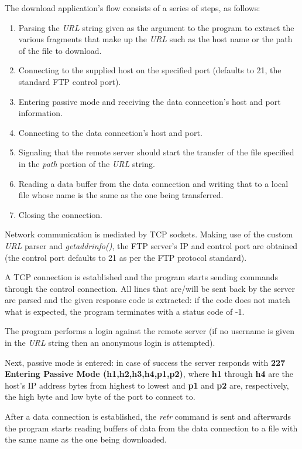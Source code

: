 \documentclass[11pt,a4paper,twocolumn]{article}
\begin{document}
The download application's flow consists of a series of steps, as follows:
\begin{enumerate}
    \item Parsing the \textit{URL} string given as the argument to the program to extract the various fragments that make up the \textit{URL} such as the host name or the path of the file to download.
    \item Connecting to the supplied host on the specified port (defaults to 21, the standard FTP control port).
    \item Entering passive mode and receiving the data connection's host and port information.
    \item Connecting to the data connection's host and port.
    \item Signaling that the remote server should start the transfer of the file specified in the \textit{path} portion of the \textit{URL} string.
    \item Reading a data buffer from the data connection and writing that to a local file whose name is the same as the one being transferred.
    \item Closing the connection.
\end{enumerate}

Network communication is mediated by TCP sockets.
Making use of the custom \textit{URL} parser and \textit{getaddrinfo()}, the FTP server's IP and control port are obtained (the control port defaults to 21 as per the FTP protocol standard).

A TCP connection is established and the program starts sending commands through the control connection. All lines that are/will be sent back by the server are parsed and the given response code is extracted: if the code does not match what is expected, the program terminates with a status code of -1.

The program performs a login against the remote server (if no username is given in the \textit{URL} string then an anonymous login is attempted).

Next, passive mode is entered: in case of success the server responds with \textbf{227 Entering Passive Mode (h1,h2,h3,h4,p1,p2)}, where \textbf{h1} through \textbf{h4} are the host's IP address bytes from highest to lowest and \textbf{p1} and \textbf{p2} are, respectively, the high byte and low byte of the port to connect to.

After a data connection is established, the \textit{retr} command is sent and afterwards the program starts reading buffers of data from the data connection to a file with the same name as the one being downloaded.
\end{document}
